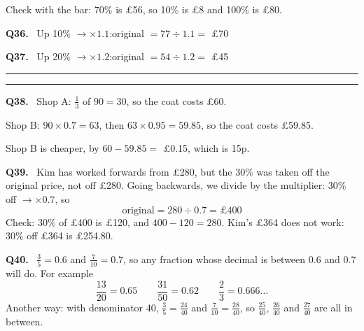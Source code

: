 \documentclass[12pt,a4paper]{article}
\newcommand{\wq}[1]{\par\addvspace{6pt}\noindent\textbf{Q#1.}\ }
\begin{document}
Check with the bar: 70\% is £56, so 10\% is £8 and 100\% is £80.

\wq{36} Up 10\% $\to\times1.1$:\quad original $=77\div1.1=$ £70

\wq{37} Up 20\% $\to\times1.2$:\quad original $=54\div1.2=$ £45

\par\addvspace{10pt}
\noindent\rule{\linewidth}{0.8pt}\par\nobreak\vspace{1pt}
\par\nobreak\vspace{1pt}
\noindent\rule{\linewidth}{0.4pt}\par\nobreak\vspace{4pt}

\wq{38} Shop A: $\frac13$ of $90=30$, so the coat costs £60.

Shop B: $90\times0.7=63$, then $63\times0.95=59.85$, so the coat costs £59.85.

Shop B is cheaper, by $60-59.85=$ £0.15, which is 15p.

\wq{39} Kim has worked forwards from £280, but the 30\% was taken off the original price, not off £280. Going backwards, we divide by the multiplier: 30\% off $\to\times0.7$, so
\[ \text{original}=280\div0.7=\text{£}400 \]
Check: 30\% of £400 is £120, and $400-120=280$. Kim's £364 does not work: 30\% off £364 is £254.80.

\wq{40} $\frac35=0.6$ and $\frac7{10}=0.7$, so any fraction whose decimal is between 0.6 and 0.7 will do. For example
\[ \frac{13}{20}=0.65\qquad \frac{31}{50}=0.62\qquad \frac23=0.666\ldots \]
Another way: with denominator 40, $\frac35=\frac{24}{40}$ and $\frac7{10}=\frac{28}{40}$, so $\frac{25}{40}$, $\frac{26}{40}$ and $\frac{27}{40}$ are all in between.
\end{document}
